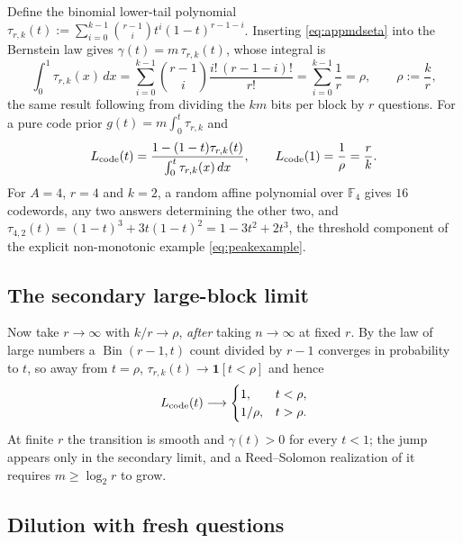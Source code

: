 Define the binomial lower-tail polynomial
$\tau_{r,k}(t) := \sum_{i=0}^{k-1}\binom{r-1}{i}t^i(1-t)^{r-1-i}$.
Inserting \eqref{eq:appmdseta} into the Bernstein law gives
$\gamma(t) = m\,\tau_{r,k}(t)$, whose integral is
%
\begin{equation}
  \int_0^1\tau_{r,k}(x)\,dx
  = \sum_{i=0}^{k-1}\binom{r-1}{i}\frac{i!\,(r-1-i)!}{r!}
  = \sum_{i=0}^{k-1}\frac1r
  = \rho,
  \qquad \rho := \frac kr,
  \label{eq:appmdsrate}
\end{equation}
%
the same result following from dividing the $km$ bits per block by
$r$ questions. For a pure code prior
$g(t) = m\int_0^t\tau_{r,k}$ and
%
\begin{equation}
  L_{\rm code}(t)
  = \frac{1-(1-t)\tau_{r,k}(t)}{\int_0^t\tau_{r,k}(x)\,dx},
  \qquad
  L_{\rm code}(1) = \frac1\rho = \frac rk . 
  \label{eq:appmdsL}
\end{equation}
%
For $A = 4$, $r = 4$ and $k = 2$, a random affine polynomial over
$\mathbb F_4$ gives $16$ codewords, any two answers determining the
other two, and
$\tau_{4,2}(t) = (1-t)^3+3t(1-t)^2 = 1-3t^2+2t^3$, the threshold
component of the explicit non-monotonic example
\eqref{eq:peakexample}.

\subsection{The secondary large-block limit}

Now take $r\to\infty$ with $k/r\to\rho$, \emph{after} taking
$n\to\infty$ at fixed $r$. By the law of large numbers a
$\operatorname{Bin}(r-1,t)$ count divided by $r-1$ converges in
probability to $t$, so away from $t = \rho$,
$\tau_{r,k}(t)\to\mathbf 1[t<\rho]$ and hence
%
\begin{equation}
  L_{\rm code}(t)\longrightarrow
  \begin{cases}
    1, & t<\rho,\\
    1/\rho, & t>\rho .
  \end{cases}
  \label{eq:appmdsstep}
\end{equation}
%
At finite $r$ the transition is smooth and $\gamma(t)>0$ for every
$t<1$; the jump appears only in the secondary limit, and a
Reed--Solomon realization of it requires $m\ge\log_2 r$ to grow.

\subsection{Dilution with fresh questions}

